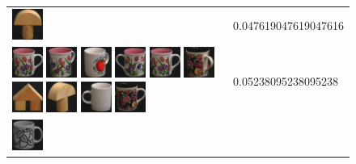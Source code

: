 \begin{figure}[tbp]
\begin{center}
\begin{tabular}{m{11cm} | m{3cm} |}
\includegraphics[width=1cm]{coil/beeld-1.eps}
& {\scriptsize 0.047619047619047616}
\\
\includegraphics[width=1cm]{coil/beeld-6.eps}
\includegraphics[width=1cm]{coil/beeld-9.eps}
\includegraphics[width=1cm]{coil/beeld-39.eps}
\includegraphics[width=1cm]{coil/beeld-7.eps}
\includegraphics[width=1cm]{coil/beeld-6.eps}
\includegraphics[width=1cm]{coil/beeld-64.eps}
\includegraphics[width=1cm]{coil/beeld-43.eps}
\includegraphics[width=1cm]{coil/beeld-3.eps}
\includegraphics[width=1cm]{coil/beeld-37.eps}
\includegraphics[width=1cm]{coil/beeld-60.eps}
& {\scriptsize 0.05238095238095238}
\\
\includegraphics[width=1cm]{coil/beeld-48.eps}

\end{tabular}
\end{center}
\end{figure}
